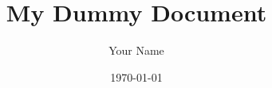 \documentclass{article}
\begin{document}
\title{My Dummy Document}
\author{Your Name}
\date{\today}

\maketitle

\cite*{harris2010}

\printbibliography
\end{document}
